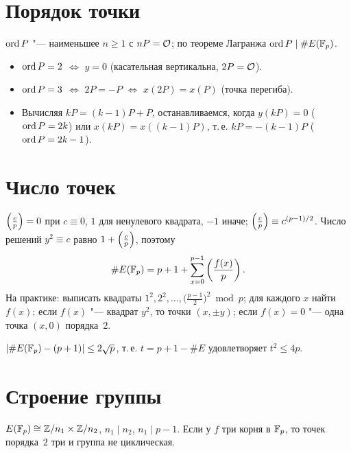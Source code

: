 \documentclass{ca-handout}
\begin{document}
\section{Порядок точки}
$\operatorname{ord} P$ "--- наименьшее $n \ge 1$ с $nP = \mathcal{O}$; по теореме Лагранжа $\operatorname{ord} P \mid \#E(\mathbb{F}_{p})$.
\begin{itemize}
  \item $\operatorname{ord} P = 2$ $\iff$ $y = 0$ (касательная вертикальна, $2P = \mathcal{O}$).
  \item $\operatorname{ord} P = 3$ $\iff$ $2P = -P$ $\iff$ $x(2P) = x(P)$ (точка перегиба).
  \item Вычисляя $kP = (k - 1)P + P$, останавливаемся, когда $y(kP) = 0$ ($\operatorname{ord} P = 2k$) или
    $x(kP) = x((k - 1)P)$, т.\,е. $kP = -(k-1)P$ ($\operatorname{ord} P = 2k - 1$).
\end{itemize}

\section{Число точек}
\begin{reminder}[title={Символ Лежандра и формула для $\#E$}]
$\left(\frac{c}{p}\right) = 0$ при $c \equiv 0$, $1$ для ненулевого квадрата, $-1$ иначе;
$\left(\frac{c}{p}\right) \equiv c^{(p-1)/2}$. Число решений $y^2 \equiv c$ равно $1 + \left(\frac{c}{p}\right)$, поэтому
\[
  \#E(\mathbb{F}_{p}) = p + 1 + \sum_{x = 0}^{p - 1} \left(\frac{f(x)}{p}\right).
\]
На практике: выписать квадраты $1^2, 2^2, \dots, \bigl(\frac{p-1}{2}\bigr)^2 \bmod p$; для каждого $x$
найти $f(x)$; если $f(x)$ "--- квадрат $y^2$, то точки $(x, \pm y)$; если $f(x) = 0$ "--- одна точка
$(x, 0)$ порядка~$2$.
\end{reminder}

\begin{reminder}[title={Теорема Хассе}]
$\lvert\#E(\mathbb{F}_{p}) - (p + 1)\rvert \le 2\sqrt p$, т.\,е. $t = p + 1 - \#E$ удовлетворяет $t^2 \le 4p$.
\end{reminder}

\section{Строение группы}
$E(\mathbb{F}_{p}) \cong \mathbb{Z}/n_1 \times \mathbb{Z}/n_2$, $n_1 \mid n_2$, $n_1 \mid p - 1$. Если у $f$ три корня в
$\mathbb{F}_{p}$, то точек порядка~$2$ три и группа не циклическая.
\end{document}
